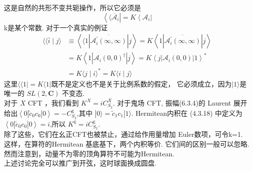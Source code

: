 这是自然的共形不变共轭操作，所以它必须是
\begin{equation}
	\left\langle\langle\overline{\mathscr{A}}_{i}\right|=K\left\langle\mathscr{A}_{i}\right|
\end{equation}
k是某个常数. 对于一个真实的例证
\begin{equation}
	\begin{aligned}
		\langle\langle\bar{i} \mid j\rangle & \equiv\left\langle\langle 1\left|\overline{\mathscr{A}_{i}^{\prime}(\infty, \infty)}\right| j\right\rangle=K\left\langle 1\left|\overline{\mathscr{A}_{i}^{\prime}(\infty, \infty)}\right| j\right\rangle \\
		&=K\left\langle 1\left|\mathscr{A}_{i}(0,0)^{\dagger}\right| j\right\rangle=K\left\langle j\left|\mathscr{A}_{i}(0,0)\right| 1\right\rangle^{*} \\
		&=K\langle j \mid i\rangle^{*}=K\langle i \mid j\rangle
	\end{aligned}
\end{equation}
这里$\langle\langle 1|=K\langle 1|$既不是定义也不是关于比例系数的假定， 它必须成立，因为$|1\rangle$是唯一的 $S L(2, \mathbf{C})$ 不变态.\\
对于 $X$ CFT ，我们看到 $K^{X}=i C_{S_{2}}^{X}$. 对于鬼场 CFT, 振幅(6.3.4)的 Laurent 展开给出$\left\langle 0\left|\tilde{c}_{0} c_{0}\right| 0\right\rangle=-C_{S_{2}}^{\mathrm{g}}$,其中 $|0\rangle=\tilde{c}_{1} c_{1}|1\rangle $.  Hermitean内积在 (4.3.18) 中定义为 $\left\langle 0\left|\tilde{c}_{0} c_{0}\right| 0\right\rangle=i$,所以 $K^{\mathrm{g}}=i C_{S_{2}}^{\mathrm{g}}$.\\
除了这些，它们在幺正CFT也被禁止，通过给作用量增加 Euler数项，可令k=1. 这样，在算符的Hermitean 基底基下，两个内积等价. 它们间的区别一般可以忽略. 然而注意到，动量不为零的顶角算符不可能为Hermitean.\\ 
上述讨论完全可以推广到开弦，这时球面换成圆盘.
